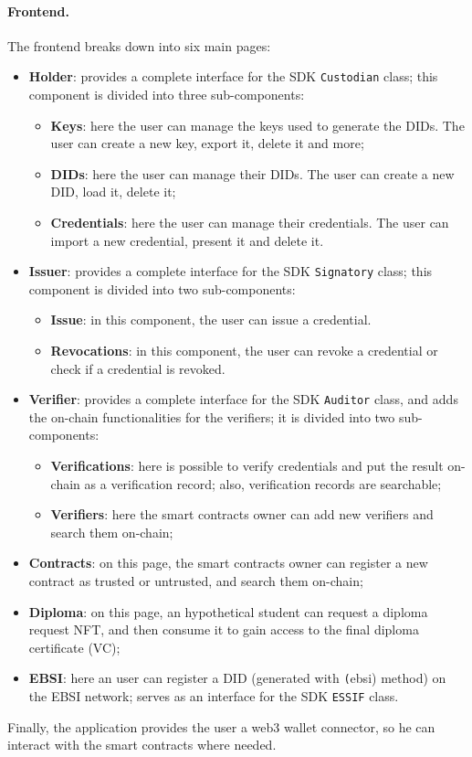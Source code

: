\paragraph{Frontend.}
The frontend breaks down into six main pages:
\begin{itemize}
    \item \textbf{Holder}: provides a complete interface for the SDK \texttt{Custodian}
    class; this component is divided into three sub-components:
    \begin{itemize}
        \item[] \textbf{Keys}: here the user can manage the keys used to generate
        the DIDs. The user can create a new key, export it, delete it and more;
        \item[] \textbf{DIDs}: here the user can manage their DIDs. The user can create
        a new DID, load it, delete it;
        \item[] \textbf{Credentials}: here the user can manage their credentials. The
        user can import a new credential, present it and delete it.
    \end{itemize}
    \item \textbf{Issuer}: provides a complete interface for the SDK \texttt{Signatory}
    class; this component is divided into two sub-components:
    \begin{itemize}
        \item[] \textbf{Issue}: in this component, the user can issue a credential.
        \item[] \textbf{Revocations}: in this component, the user can revoke a credential
        or check if a credential is revoked.
    \end{itemize}
    \item \textbf{Verifier}: provides a complete interface for the SDK \texttt{Auditor}
    class, and adds the on-chain functionalities for the verifiers; it is divided into 
    two sub-components:
    \begin{itemize}
        \item[] \textbf{Verifications}: here is possible to verify credentials and put the
        result on-chain as a verification record; also, verification records are searchable;
        \item[] \textbf{Verifiers}: here the smart contracts owner can add new verifiers
        and search them on-chain;
    \end{itemize}
    \item \textbf{Contracts}: on this page, the smart contracts owner can register a new
    contract as trusted or untrusted, and search them on-chain;
    \item \textbf{Diploma}: on this page, an hypothetical student can request a diploma request
    NFT, and then consume it to gain access to the final diploma certificate (VC);
    \item \textbf{EBSI}: here an user can register a DID (generated with \texttt(ebsi)
    method) on the EBSI network; serves as an interface for the SDK \texttt{ESSIF} class.
\end{itemize}
Finally, the application provides the user a web3 wallet connector, so he can interact
with the smart contracts where needed.

